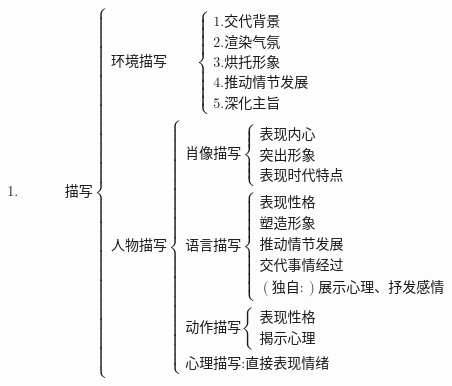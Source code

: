 \documentclass[11pt]{article}
\begin{document}
\begin{enumerate}
\item
$$
\mbox{描写}
\begin{cases}
\mbox{环境描写} \quad \quad
  \begin{cases}
  1. \mbox{交代背景} \\
  2. \mbox{渲染气氛} \\
  3. \mbox{烘托形象} \\
  4. \mbox{推动情节发展} \\
  5. \mbox{深化主旨}
  \end{cases} \\
\mbox{人物描写}
  \begin{cases}
  \mbox{肖像描写}
    \begin{cases}
    \mbox{表现内心} \\
    \mbox{突出形象} \\
    \mbox{表现时代特点}
    \end{cases} \\
  \mbox{语言描写}
    \begin{cases}
    \mbox{表现性格} \\
    \mbox{塑造形象} \\
    \mbox{推动情节发展} \\
    \mbox{交代事情经过} \\
    (\mbox{独自}:) \mbox{展示心理、抒发感情}
    \end{cases} \\
  \mbox{动作描写}
    \begin{cases}
    \mbox{表现性格} \\
    \mbox{揭示心理}
    \end{cases} \\
  \mbox{心理描写} : \mbox{直接表现情绪}
  \end{cases}
\end{cases}
$$


\end{enumerate}
\end{document}
